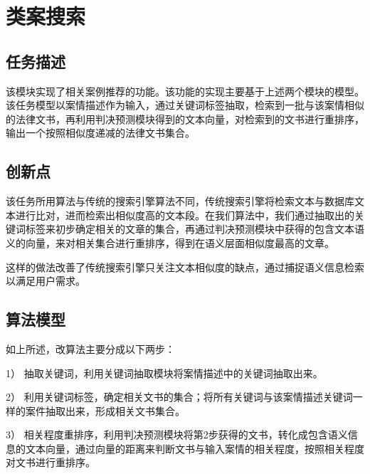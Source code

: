 \section{类案搜索}
\subsection{任务描述}
该模块实现了相关案例推荐的功能。该功能的实现主要基于上述两个模块的模型。该任务模型以案情描述作为输入，通过关键词标签抽取，检索到一批与该案情相似的法律文书，再利用判决预测模块得到的文本向量，对检索到的文书进行重排序，输出一个按照相似度递减的法律文书集合。

\subsection{创新点}
该任务所用算法与传统的搜索引擎算法不同，传统搜索引擎将检索文本与数据库文本进行比对，进而检索出相似度高的文本段。在我们算法中，我们通过抽取出的关键词标签来初步确定相关的文章的集合，再通过判决预测模块中获得的包含文本语义的向量，来对相关集合进行重排序，得到在语义层面相似度最高的文章。

这样的做法改善了传统搜索引擎只关注文本相似度的缺点，通过捕捉语义信息检索以满足用户需求。

\subsection{算法模型}
如上所述，改算法主要分成以下两步：

1）	抽取关键词，利用关键词抽取模块将案情描述中的关键词抽取出来。

2）	利用关键词标签，确定相关文书的集合；将所有关键词与该案情描述关键词一样的案件抽取出来，形成相关文书集合。

3）	相关程度重排序，利用判决预测模块将第2步获得的文书，转化成包含语义信息的文本向量，通过向量的距离来判断文书与输入案情的相关程度，按照相关程度对文书进行重排序。



